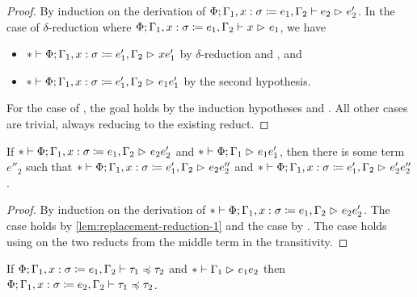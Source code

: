 \begin{proof}
By induction on the derivation of
$\Phi; \Gamma_1, x \mathrel{:} \sigma \mathrel{\coloneqq} e_1, \Gamma_2 \mathrel{\vdash} e_2 \mathrel{\rhd}_{} e'_2$.
In the case of $\delta$-reduction where
$\Phi; \Gamma_1, x \mathrel{:} \sigma \mathrel{\coloneqq} e_1, \Gamma_2 \mathrel{\vdash} x \mathrel{\rhd}_{} e_1$,
we have
\begin{itemize}[noitemsep]
  \item $* \mathrel{\vdash} \Phi; \Gamma_1, x \mathrel{:} \sigma \mathrel{\coloneqq} e'_1, \Gamma_2 \mathrel{\rhd}_{} x{e'_1}$ by $\delta$-reduction and , and
  \item $* \mathrel{\vdash} \Phi; \Gamma_1, x \mathrel{:} \sigma \mathrel{\coloneqq} e'_1, \Gamma_2 \mathrel{\rhd}_{} e_1{e'_1}$ by the second hypothesis.
\end{itemize}
For the case of ,
the goal holds by the induction hypotheses and .
All other cases are trivial, always reducing to the existing reduct.
\end{proof}

\begin{lemma} \label{lem:replacement-reduction-2}
If $* \mathrel{\vdash} \Phi; \Gamma_1, x \mathrel{:} \sigma \mathrel{\coloneqq} e_1, \Gamma_2 \mathrel{\rhd}_{} e_2{e'_2}$
and $* \mathrel{\vdash} \Phi; \Gamma_1 \mathrel{\rhd}_{} e_1{e'_1}$,
then there is some term $e''_2$
such that $* \mathrel{\vdash} \Phi; \Gamma_1, x \mathrel{:} \sigma \mathrel{\coloneqq} e'_1, \Gamma_2 \mathrel{\rhd}_{} e_2{e''_2}$
and $* \mathrel{\vdash} \Phi; \Gamma_1, x \mathrel{:} \sigma \mathrel{\coloneqq} e'_1, \Gamma_2 \mathrel{\rhd}_{} e'_2{e''_2}$.
\end{lemma}

\begin{proof}
By induction on the derivation of
$* \mathrel{\vdash} \Phi; \Gamma_1, x \mathrel{:} \sigma \mathrel{\coloneqq} e_1, \Gamma_2 \mathrel{\rhd}_{} e_2{e'_2}$.
The  case holds by \cref{lem:replacement-reduction-1} and
the  case by .
The  case holds using 
on the two reducts from the middle term in the transitivity.
\end{proof}

\begin{lemma} \label{lem:replacement-reduction-3}
If $\Phi; \Gamma_1, x \mathrel{:} \sigma \mathrel{\coloneqq} e_1, \Gamma_2 \mathrel{\vdash} \tau_1 \mathrel{\preccurlyeq} \tau_2$
and $* \mathrel{\vdash} \Gamma_1 \mathrel{\rhd}_{} e_1{e_2}$
then $\Phi; \Gamma_1, x \mathrel{:} \sigma \mathrel{\coloneqq} e_2, \Gamma_2 \mathrel{\vdash} \tau_1 \mathrel{\preccurlyeq} \tau_2$.
\end{lemma}

